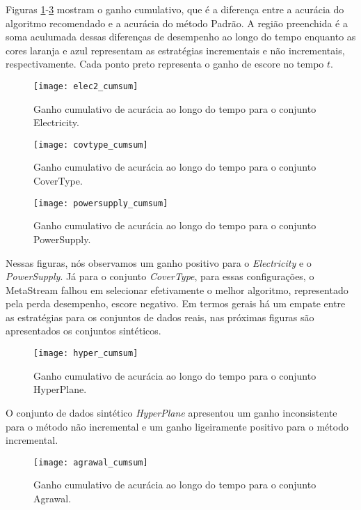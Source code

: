 Figuras \ref{fig:cumsum_elec2}-\ref{fig:cumsum_powersupply} mostram o ganho cumulativo, que é a diferença entre a acurácia do algoritmo recomendado e a acurácia do método Padrão. A região preenchida é a soma aculumada dessas diferenças de desempenho ao longo do tempo enquanto as cores laranja e azul representam as estratégias incrementais e não incrementais, respectivamente. Cada ponto preto representa o ganho de escore no tempo $t$.

\begin{figure}[!t]
    \centering
    \texttt{[image: elec2\_cumsum]}
    \caption{Ganho cumulativo de acurácia ao longo do tempo para o conjunto Electricity.}
    \label{fig:cumsum_elec2}
\end{figure}

\begin{figure}[!t]
    \centering
    \texttt{[image: covtype\_cumsum]}
    \caption{Ganho cumulativo de acurácia ao longo do tempo para o conjunto CoverType.}
    \label{fig:cumsum_covtype}
\end{figure}

\begin{figure}[!t]
    \centering
    \texttt{[image: powersupply\_cumsum]}
    \caption{Ganho cumulativo de acurácia ao longo do tempo para o conjunto PowerSupply.}
    \label{fig:cumsum_powersupply}
\end{figure}

Nessas figuras, nós observamos um ganho positivo para o \textit{Electricity} e o \textit{PowerSupply}. Já para o conjunto \textit{CoverType}, para essas configurações, o MetaStream falhou em selecionar efetivamente o melhor algoritmo, representado pela perda desempenho, escore negativo. Em termos gerais há um empate entre as estratégias para os conjuntos de dados reais, nas próximas figuras são apresentados os conjuntos sintéticos.

\begin{figure}[!t]
    \centering
    \texttt{[image: hyper\_cumsum]}
    \caption{Ganho cumulativo de acurácia ao longo do tempo para o conjunto HyperPlane.}
    \label{fig:cumsum_hyper}
\end{figure}

O conjunto de dados sintético \textit{HyperPlane} apresentou um ganho inconsistente para o método não incremental e um ganho ligeiramente positivo para o método incremental.

\begin{figure}[!t]
    \centering
    \texttt{[image: agrawal\_cumsum]}
    \caption{Ganho cumulativo de acurácia ao longo do tempo para o conjunto Agrawal.}
    \label{fig:cumsum_agrawal}
\end{figure}

